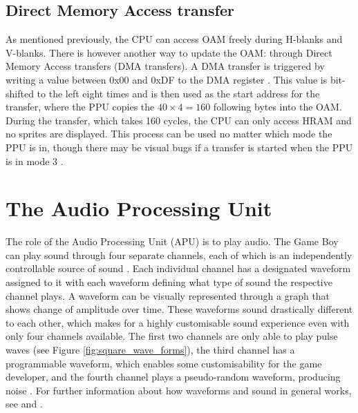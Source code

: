\subsection{Direct Memory Access transfer}
\label{sec:DMA_transfer}
As mentioned previously, the CPU can access OAM freely during H-blanks and V-blanks. There is however another way to update the OAM: through Direct Memory Access transfers (DMA transfers). A DMA transfer is triggered by writing a value between 0x00 and 0xDF to the DMA register \cite{pandocsdma}. This value is bit-shifted to the left eight times and is then used as the start address for the transfer, where the PPU copies the $40 \times 4 = 160$ following bytes into the OAM. During the transfer, which takes 160 cycles, the CPU can only access HRAM and no sprites are displayed. This process can be used no matter which mode the PPU is in, though there may be visual bugs if a transfer is started when the PPU is in mode 3 \cite{pandocsdma}.
\newpage
\section{The Audio Processing Unit }
\label{sec:APU}
The role of the Audio Processing Unit (APU) is to play audio. The Game Boy can play sound through four separate channels, each of which is an independently controllable source of sound \cite{pandocssound}. Each individual channel has a designated waveform assigned to it with each waveform defining what type of sound the respective channel plays. A waveform can be visually represented through a graph that shows change of amplitude over time. These waveforms sound drastically different to each other, which makes for a highly customisable sound experience even with only four channels available. The first two channels are only able to play pulse waves (see Figure \ref{fig:square_wave_forms}), the third channel has a programmable waveform, which enables some customisability for the game developer, and the fourth channel plays a pseudo-random waveform, producing noise \cite{AudioHardware}. For further information about how waveforms and sound in general works, see \cite{waveforms} and \cite{sinToSquare}.

